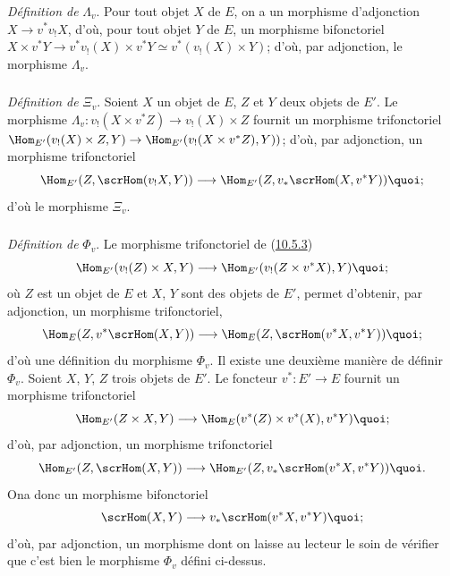 \documentclass[10pt]{../fichiers-configuration-latex/smfart}
\begin{document}
\subsubsection{}
\emph{Définition de} $\Lambda_v$. Pour tout objet $X$ de $E$, on a
un morphisme d'adjonction $X\rightarrow v^{\ast}v_{!}X$, d'où, pour
tout objet $Y$ de $E$, un morphisme bifonctoriel $X\times
v^{\ast}Y\rightarrow v^{\ast}v_{!}(X)\times v^{\ast}Y\simeq
v^{\ast}(v_{!}(X)\times Y)$; d'où, par adjonction, le morphisme
$\Lambda_v$.

\subsubsection{}
\emph{Définition de} $\Xi_v$. Soient $X$ un objet de $E$, $Z$ et $Y$
deux objets de $E'$. Le morphisme $\Lambda_v:v_{!}(X\times
v^{\ast}Z)\rightarrow v_{!}(X)\times Z$ fournit un morphisme
trifonctoriel $\Hom_{E'}(v_{!}(X)\times Z,Y)\rightarrow
\Hom_{E'}(v_{!}(X\times v^{\ast}Z),Y))$; d'où, par adjonction, un
morphisme trifonctoriel
$$
\Hom_{E'}(Z,\scrHom(v_{!}X,Y))\longrightarrow
\Hom_{E'}(Z,v_{\ast}\scrHom(X,v^{\ast}Y)){\quoi};
$$
d'où le morphisme $\Xi_v$.

\subsubsection{}
\emph{Définition de} $\Phi_v$. Le morphisme trifonctoriel de
(\hyperref[IV.subsubsec10.5.3]{10.5.3})
$$
\Hom_{E'}(v_{!}(Z)\times X,Y)\longrightarrow \Hom_{E'}(v_{!}(Z\times
v^{\ast}X),Y){\quoi};
$$
où $Z$ est un objet de $E$ et $X$, $Y$ sont des objets de $E'$,
permet d'obtenir, par adjonction, un morphisme trifonctoriel,
$$
\Hom_E(Z,v^{\ast}\scrHom(X,Y))\longrightarrow
\Hom_E(Z,\scrHom(v^{\ast}X, v^{\ast}Y)){\quoi};
$$
d'où une définition du morphisme $\Phi_v$. Il existe une deuxième
manière de définir $\Phi_v$. Soient $X$, $Y$, $Z$ trois objets de
$E'$. Le foncteur $v^{\ast}:E'\rightarrow E$ fournit un morphisme
trifonctoriel
$$
\Hom_{E'}(Z\times X,Y)\longrightarrow \Hom_E (v^{\ast}(Z)\times
v^{\ast}(X), v^{\ast}Y){\quoi};
$$
d'où, par adjonction, un morphisme trifonctoriel
$$
\Hom_{E'}(Z,\scrHom(X,Y))\longrightarrow
\Hom_{E'}(Z,v_{\ast}\scrHom(v^{\ast}X, v^{\ast}Y)){\quoi}.
$$
On\pageoriginale a donc un morphisme bifonctoriel
$$
\scrHom(X,Y)\longrightarrow v_{\ast}\scrHom(v^{\ast}X,
v^{\ast}Y){\quoi};
$$
d'où, par adjonction, un morphisme dont on laisse au lecteur le soin
de vérifier que c'est bien le morphisme $\Phi_v$ défini ci-dessus.
\end{document}
